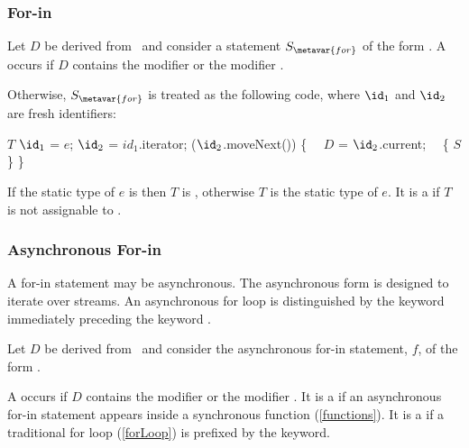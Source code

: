 \documentclass[makeidx]{article}
\begin{document}
{\subsubsection{For-in}

\LMHash{}%
Let $D$ be derived from \ and
consider a \FOR{} statement $S_{\metavar{for}}$ of the form
.
A  occurs if $D$ contains
the modifier \CONST{} or the modifier \LATE.

\LMHash{}%
Otherwise, $S_{\metavar{for}}$ is treated as the following code,
where $\id_1$ and $\id_2$ are fresh identifiers:

\begin{normativeDartCode}
$T$ $\id_1$ = $e$;
\VAR{} $\id_2$ = $id_1$.iterator;
\WHILE{} ($\id_2$.moveNext()) \{
\ \ $D$ \id{} = $\id_2$.current;
\ \ \{ $S$ \}
\}
\end{normativeDartCode}

\noindent
If the static type of $e$ is \DYNAMIC{}
then $T$ is ,
otherwise $T$ is the static type of $e$.
It is a  if $T$ is not assignable to
.



\subsubsection{Asynchronous For-in}

\LMHash{}%
A for-in statement may be asynchronous.
The asynchronous form is designed to iterate over streams.
An asynchronous for loop is distinguished by
the keyword \AWAIT{} immediately preceding the keyword \FOR.

\LMHash{}%
Let $D$ be derived from \ and
consider the asynchronous for-in statement, $f$, of the form
.

\LMHash{}%
A  occurs if $D$ contains
the modifier \CONST{} or the modifier \LATE.
It is a  if an asynchronous for-in statement appears
inside a synchronous function (\ref{functions}).
It is a  if a traditional for loop (\ref{forLoop}) is
prefixed by the \AWAIT{} keyword.

}
\end{document}
